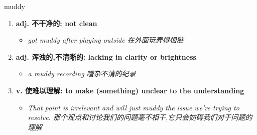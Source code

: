 
\begin{frame}
{\huge muddy}
\begin{center}
\begin{enumerate}\Large
  \item \textbf{adj. 不干净的: not clean}
  \begin{itemize}
    \item \em{\Large{got muddy after playing outside 在外面玩弄得很脏}}
  \end{itemize}
  \item \textbf{adj. 浑浊的,不清晰的: lacking in clarity or brightness}
  \begin{itemize}
    \item \em{\Large{a muddy recording 嘈杂不清的纪录}}
  \end{itemize}
  \item \textbf{v. 使难以理解: to make (something) unclear to the understanding}
  \begin{itemize}
    \item \em{\Large{That point is irrelevant and will just muddy the issue we're trying to resolve. 那个观点和讨论我们的问题毫不相干,它只会妨碍我们对于问题的理解}}
  \end{itemize}
\end{enumerate}
\end{center}
\end{frame}
